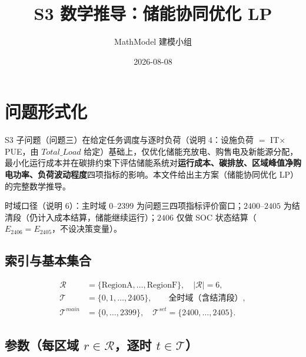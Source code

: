 \documentclass{internal-report}
\title{S3 数学推导：储能协同优化 LP}
\author{MathModel 建模小组}
\date{2026-08-08}
\begin{document}
\maketitle

\section{问题形式化}

S3 子问题（问题三）在给定任务调度与逐时负荷（说明 4：设施负荷 $=$ IT$\times$PUE，由 $Total\_Load$ 给定）基础上，仅优化储能充放电、购售电及新能源分配，最小化运行成本并在碳排约束下评估储能系统对\textbf{运行成本、碳排放、区域峰值净购电功率、负荷波动程度}四项指标的影响。本文件给出主方案（储能协同优化 LP）的完整数学推导。

时域口径（说明 6）：主时域 $0$--$2399$ 为问题三四项指标评价窗口；$2400$--$2405$ 为结清段（仍计入成本结算，储能继续运行）；$2406$ 仅做 SOC 状态结算（$E_{2406}=E_{2405}$，不设决策变量）。

\subsection{索引与基本集合}

\begin{align}
  \mathcal{R} &= \{\text{RegionA},\ldots,\text{RegionF}\},\quad |\mathcal{R}|=6, \label{eq:regions}\\
  \mathcal{T} &= \{0,1,\ldots,2405\},\qquad \text{全时域（含结清段）},\\
  \mathcal{T}^{main} &= \{0,\ldots,2399\},\quad \mathcal{T}^{set} = \{2400,\ldots,2405\}.
\end{align}

\subsection{参数（每区域 $r\in\mathcal{R}$，逐时 $t\in\mathcal{T}$）}
\end{document}
